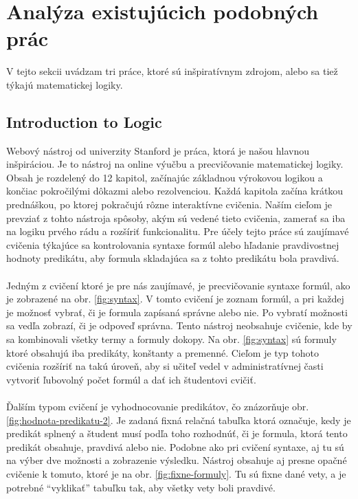 \section{Analýza existujúcich podobných prác}
V tejto sekcii uvádzam tri práce, ktoré sú inšpiratívnym zdrojom, alebo sa tiež týkajú matematickej logiky.

\subsection{Introduction to Logic}
Webový nástroj od univerzity Stanford \cite{intro_to_logic} je práca, ktorá je našou hlavnou inšpiráciou. Je to nástroj na online výučbu a precvičovanie matematickej logiky. Obsah je rozdelený do 12 kapitol, začínajúc základnou výrokovou logikou a končiac pokročilými dôkazmi alebo rezolvenciou. Každá kapitola začína krátkou prednáškou, po ktorej pokračujú rôzne interaktívne cvičenia. Naším cieľom je prevziať z tohto nástroja spôsoby, akým sú vedené tieto cvičenia, zamerať sa iba na logiku prvého rádu a rozšíriť funkcionalitu. Pre účely tejto práce sú zaujímavé cvičenia týkajúce sa kontrolovania syntaxe formúl alebo hľadanie pravdivostnej hodnoty predikátu, aby formula skladajúca sa z tohto predikátu bola pravdivá.

\paragraph{}
Jedným z cvičení ktoré je pre nás zaujímavé, je precvičovanie syntaxe formúl, ako je zobrazené na obr. \ref{fig:syntax}. V tomto cvičení je zoznam formúl, a pri každej je možnosť vybrať, či je formula zapísaná správne alebo nie. Po vybratí možnosti sa vedľa zobrazí, či je odpoveď správna. Tento nástroj neobsahuje cvičenie, kde by sa kombinovali všetky termy a formuly dokopy. Na obr. \ref{fig:syntax} sú formuly ktoré obsahujú iba predikáty, konštanty a premenné. Cieľom je typ tohoto cvičenia rozšíriť na takú úroveň, aby si učiteľ vedel v administratívnej časti vytvoriť ľubovolný počet formúl a dať ich študentovi cvičiť. 

\paragraph{}
Ďalším typom cvičení je vyhodnocovanie predikátov, čo znázorňuje obr. \ref{fig:hodnota-predikatu-2}. Je zadaná fixná relačná tabuľka ktorá označuje, kedy je predikát splnený a študent musí podľa toho rozhodnúť, či je formula, ktorá tento predikát obsahuje, pravdivá alebo nie. Podobne ako pri cvičení syntaxe, aj tu sú na výber dve možnosti a zobrazenie výsledku. Nástroj obsahuje aj presne opačné cvičenie k tomuto, ktoré je na obr. \ref{fig:fixne-formuly}. Tu sú fixne dané vety, a je potrebné ``vyklikať'' tabuľku tak, aby všetky vety boli pravdivé.

